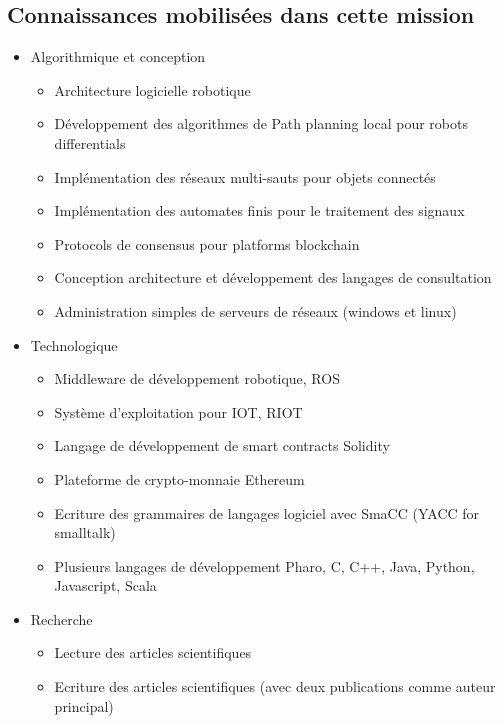 \documentclass{resume} %
\begin{document}
	\subsection {Connaissances mobilisées dans cette mission }
	\begin{itemize} 				
			\item Algorithmique et conception 
					\begin{itemize}
						\item Architecture logicielle robotique 
						\item Développement des algorithmes de Path planning local pour robots differentials 
						\item Implémentation des réseaux  multi-sauts pour objets connectés 
						\item Implémentation des automates finis pour le traitement des signaux
						\item Protocols de consensus pour platforms blockchain 
						\item Conception architecture et développement des langages de consultation 
						\item Administration simples de serveurs de réseaux (windows et linux)
					\end {itemize}
			\item Technologique
					\begin{itemize}
						\item Middleware de développement robotique, ROS 
						\item Système d'exploitation pour IOT, RIOT 
						\item Langage de développement de smart contracts Solidity 
						\item Plateforme de crypto-monnaie Ethereum
						\item Ecriture des grammaires de langages logiciel avec SmaCC (YACC for smalltalk) 
						\item Plusieurs langages de développement Pharo, C, C++, Java, Python, Javascript, Scala
					\end {itemize}
			\item  Recherche 
				\begin{itemize}
						\item Lecture des articles scientifiques 
						\item Ecriture des articles scientifiques (avec deux publications comme auteur principal) 
				\end {itemize}
		\end{itemize}
		


		
\end{document}
